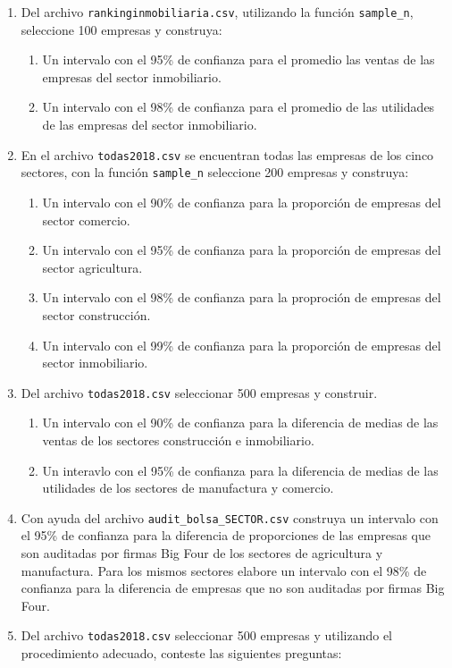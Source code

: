 \documentclass[letterpaper,]{book}
\providecommand{\tightlist}{%
  \setlength{\itemsep}{0pt}\setlength{\parskip}{0pt}}
\begin{document}
\begin{enumerate}
\def\labelenumi{\arabic{enumi}.}
\item
  Del archivo \texttt{rankinginmobiliaria.csv}, utilizando la función \texttt{sample\_n}, seleccione 100 empresas y construya:

  \begin{enumerate}
  \def\labelenumii{\alph{enumii}.}
  \tightlist
  \item
    Un intervalo con el 95\% de confianza para el promedio las ventas de las empresas del sector inmobiliario.
  \item
    Un intervalo con el 98\% de confianza para el promedio de las utilidades de las empresas del sector inmobiliario.
  \end{enumerate}
\item
  En el archivo \texttt{todas2018.csv} se encuentran todas las empresas de los cinco sectores, con la función \texttt{sample\_n} seleccione 200 empresas y construya:

  \begin{enumerate}
  \def\labelenumii{\alph{enumii}.}
  \tightlist
  \item
    Un intervalo con el 90\% de confianza para la proporción de empresas del sector comercio.
  \item
    Un intervalo con el 95\% de confianza para la proporción de empresas del sector agricultura.
  \item
    Un intervalo con el 98\% de confianza para la proproción de empresas del sector construcción.
  \item
    Un intervalo con el 99\% de confianza para la proporción de empresas del sector inmobiliario.
  \end{enumerate}
\item
  Del archivo \texttt{todas2018.csv} seleccionar 500 empresas y construir.

  \begin{enumerate}
  \def\labelenumii{\alph{enumii}.}
  \tightlist
  \item
    Un intervalo con el 90\% de confianza para la diferencia de medias de las ventas de los sectores construcción e inmobiliario.
  \item
    Un interavlo con el 95\% de confianza para la diferencia de medias de las utilidades de los sectores de manufactura y comercio.
  \end{enumerate}
\item
  Con ayuda del archivo \texttt{audit\_bolsa\_SECTOR.csv} construya un intervalo con el 95\% de confianza para la diferencia de proporciones de las empresas que son auditadas por firmas Big Four de los sectores de agricultura y manufactura. Para los mismos sectores elabore un intervalo con el 98\% de confianza para la diferencia de empresas que no son auditadas por firmas Big Four.
\item
  Del archivo \texttt{todas2018.csv} seleccionar 500 empresas y utilizando el procedimiento adecuado, conteste las siguientes preguntas:


\end{enumerate}
\end{document}
